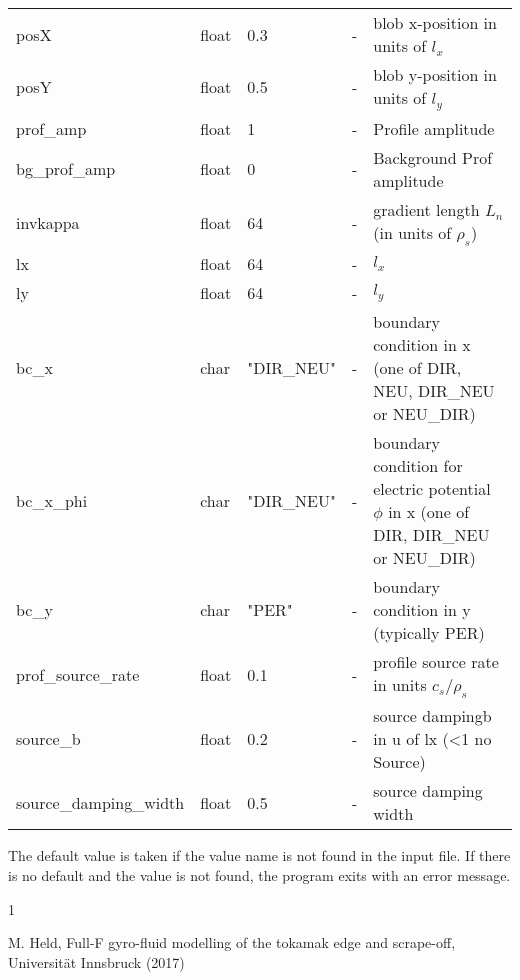 \documentclass{hitec} %
\renewenvironment{thebibliography}[1]{
  \begin{oldthebibliography}{#1}
    \RaggedRight %
    \setlength{\itemsep}{0em}
    \setlength{\parskip}{0em}
}
{
  \end{oldthebibliography}
}
\begin{document}
\begin{longtable}{llll>{\RaggedRight}p{7cm}}
posX       & float &0.3    & - & blob x-position in units of $l_x$\\
posY       & float &0.5    & - & blob y-position in units of $l_y$ \\
prof\_amp    & float &1   & - &Profile amplitude \\
bg\_prof\_amp& float &0   & - &Background Prof amplitude  \\
invkappa   & float &64   & - &gradient length $L_n$ (in units of $\rho_s$)   \\
lx         & float &64   & - & $l_x$  \\
ly         & float &64  & - & $l_y$  \\
bc\_x   & char & "DIR\_NEU"      & - & boundary condition in x (one of DIR, NEU, DIR\_NEU or NEU\_DIR) \\
bc\_x\_phi   & char & "DIR\_NEU"      & - & boundary condition for electric potential $\phi$ in x (one of  DIR, DIR\_NEU or NEU\_DIR) \\
bc\_y   & char & "PER"      & - & boundary condition in y (typically PER) \\
prof\_source\_rate     & float &0.1  & - & profile source rate in units $c_s/\rho_s$ \\
source\_b             & float &0.2  & - & source dampingb in u of lx (<1 no Source)  \\
source\_damping\_width & float &0.5  & - & source damping width  \\
\bottomrule
\end{longtable}

The default value is taken if the value name is not found in the input file. If there is no default and
the value is not found,
the program exits with an error message.
\begin{thebibliography}{1}
  M. Held, Full-F gyro-fluid modelling of the tokamak edge and scrape-off, Universit{\"a}t Innsbruck (2017)
\end{thebibliography}
\end{document}

